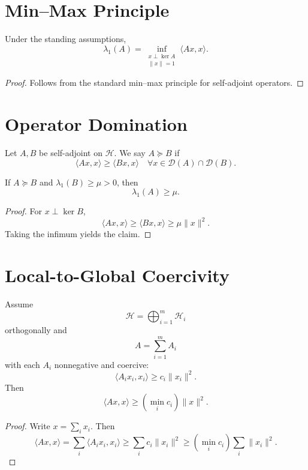 \section{Min--Max Principle}

\begin{theorem}
Under the standing assumptions,
\[
\lambda_1(A)
=
\inf_{\substack{x \perp \ker A \\ \|x\|=1}}
\langle Ax,x\rangle.
\]
\end{theorem}

\begin{proof}
Follows from the standard min--max principle for self-adjoint operators.
\end{proof}

\section{Operator Domination}

\begin{definition}[Domination]
Let $A,B$ be self-adjoint on $\mathcal{H}$.  
We say $A \succeq B$ if
\[
\langle Ax,x\rangle \ge \langle Bx,x\rangle
\quad
\forall x \in \mathcal{D}(A)\cap\mathcal{D}(B).
\]
\end{definition}

\begin{theorem}
If $A \succeq B$ and $\lambda_1(B)\ge \mu>0$, then
\[
\lambda_1(A)\ge \mu.
\]
\end{theorem}

\begin{proof}
For $x \perp \ker B$,
\[
\langle Ax,x\rangle \ge \langle Bx,x\rangle
\ge \mu \|x\|^2.
\]
Taking the infimum yields the claim.
\end{proof}

\section{Local-to-Global Coercivity}

\begin{theorem}
Assume
\[
\mathcal{H} = \bigoplus_{i=1}^m \mathcal{H}_i
\]
orthogonally and
\[
A = \sum_{i=1}^m A_i
\]
with each $A_i$ nonnegative and coercive:
\[
\langle A_i x_i,x_i\rangle \ge c_i \|x_i\|^2.
\]
Then
\[
\langle Ax,x\rangle
\ge
\left(\min_i c_i\right)\|x\|^2.
\]
\end{theorem}

\begin{proof}
Write $x=\sum_i x_i$. Then
\[
\langle Ax,x\rangle
=
\sum_i \langle A_i x_i,x_i\rangle
\ge
\sum_i c_i \|x_i\|^2
\ge
\left(\min_i c_i\right)\sum_i \|x_i\|^2.
\]
\end{proof}

